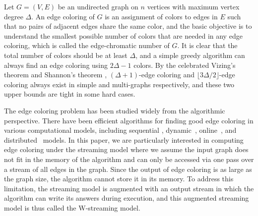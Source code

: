 \documentclass[11pt,a4paper]{article}
\newcommand{\floor}[1]{\lfloor #1 \rfloor}
\begin{document}
Let $G = (V, E)$ be an undirected graph on $n$ vertices with maximum vertex degree $\Delta$. An edge coloring of $G$ is an assignment of colors to edges in $E$ such that no pairs of adjacent edges share the same color, and the basic objective is to understand the smallest possible number of colors that are needed in any edge coloring, which is called the edge-chromatic number of $G$. It is clear that the total number of colors should be at least $\Delta$, and a simple greedy algorithm can always find an edge coloring using $2\Delta-1$ colors. By the celebrated Vizing's theorem \cite{vizing1965chromatic} and Shannon's theorem \cite{shannon1949theorem}, $(\Delta+1)$-edge coloring and $\floor{3\Delta/2}$-edge coloring always exist in simple and multi-graphs respectively, and these two upper bounds are tight in some hard cases.

The edge coloring problem has been studied widely from the algorithmic perspective. There have been efficient algorithms for finding good edge coloring in various computational models, including sequential \cite{arjomandi1982efficient,gabow1985algorithms,sinnamon2019fast,Assadi24,BhattacharyaCCSZ24,BhattacharyaCSZ24,assadi2024vizing},  dynamic~\cite{BarenboimM17,BhattacharyaCHN18,duan2019dynamic,Christiansen23,BhattacharyaCPS24,Christiansen24}, online~\cite{CohenPW19,BhattacharyaGW21,SaberiW21,KulkarniLSST22,BilkstadSVW24,BlikstadOnline2025,dudeja2024randomizedgreedyonlineedge}, and distributed~\cite{panconesi2001some,elkin20142delta,fischer2017deterministic,ghaffari2018deterministic,balliu2022distributed,ChangHLPU20,Bernshteyn22,Christiansen23,Davies23} models. In this paper, we are particularly interested in computing edge coloring under the streaming model where we assume the input graph does not fit in the memory of the algorithm and can only be accessed via one pass over a stream of all edges in the graph. Since the output of edge coloring is as large as the graph size, the algorithm cannot store it in its memory. To address this limitation, the streaming model is augmented with an output stream in which the algorithm can write its answers during execution, and this augmented streaming model is thus called the W-streaming model.
\end{document}
